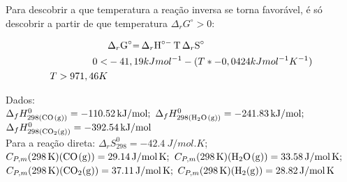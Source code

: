 Para descobrir a que temperatura a reação inversa se torna favorável, é só descobrir a partir de que temperatura \(\Delta_rG^\circ > 0\):

\begin{align*}
	\ce{ &\Delta_rG^\circ = \Delta_rH^\circ - T \Delta_rS^\circ} \\
	0 < &-41,19kJmol^{-1} - (T * - 0,0424kJmol^{-1}K^{-1})\\
	T > 971,46 K
\end{align*}


\noindent Dados:\\
\( \Delta_f H^0_{298(\ce{CO(g)})} = \qty{-110.52}{kJ \per mol};\) 
\( \Delta_f H^0_{298(\ce{H2O(g)})} = \qty{-241.83}{kJ \per mol};\) 
\( \Delta_f H^0_{298(\ce{CO2(g)})} = \qty{-392.54}{kJ \per mol}\) \\
Para a reação direta: \( \Delta _r S^0_{298} = \qty{-42.4}{J \per mol . K} \);\\
\(C_{P,m} (\qty{298}{K}) (\ce{CO(g)}) = \qty{29.14}{J \per mol . K}; \)
\(C_{P,m} (\qty{298}{K}) (\ce{H2O(g)}) = \qty{33.58}{J \per mol . K}; \)\\
\(C_{P,m} (\qty{298}{K}) (\ce{CO2(g)}) = \qty{37.11}{J \per mol . K}; \)
\(C_{P,m} (\qty{298}{K}) (\ce{H2(g)}) = \qty{28.82}{J \per mol . K} \)
